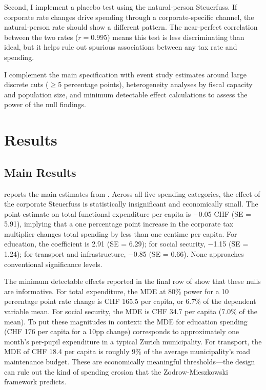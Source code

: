 \documentclass[12pt]{article}
\begin{document}
Second, I implement a placebo test using the natural-person Steuerfuss. If corporate rate changes drive spending through a corporate-specific channel, the natural-person rate should show a different pattern. The near-perfect correlation between the two rates ($r = 0.995$) means this test is less discriminating than ideal, but it helps rule out spurious associations between any tax rate and spending.

I complement the main specification with event study estimates around large discrete cuts ($\geq$5 percentage points), heterogeneity analyses by fiscal capacity and population size, and minimum detectable effect calculations to assess the power of the null findings.


\section{Results}
\label{sec:results}

\subsection{Main Results}

 reports the main estimates from . Across all five spending categories, the effect of the corporate Steuerfuss is statistically insignificant and economically small. The point estimate on total functional expenditure per capita is $-$0.05 CHF (SE = 5.91), implying that a one percentage point increase in the corporate tax multiplier changes total spending by less than one centime per capita. For education, the coefficient is 2.91 (SE = 6.29); for social security, $-$1.15 (SE = 1.24); for transport and infrastructure, $-$0.85 (SE = 0.66). None approaches conventional significance levels.

The minimum detectable effects reported in the final row of  show that these nulls are informative. For total expenditure, the MDE at 80\% power for a 10 percentage point rate change is CHF 165.5 per capita, or 6.7\% of the dependent variable mean. For social security, the MDE is CHF 34.7 per capita (7.0\% of the mean). To put these magnitudes in context: the MDE for education spending (CHF 176 per capita for a 10pp change) corresponds to approximately one month's per-pupil expenditure in a typical Zurich municipality. For transport, the MDE of CHF 18.4 per capita is roughly 9\% of the average municipality's road maintenance budget. These are economically meaningful thresholds---the design can rule out the kind of spending erosion that the Zodrow-Mieszkowski framework predicts.
\end{document}
